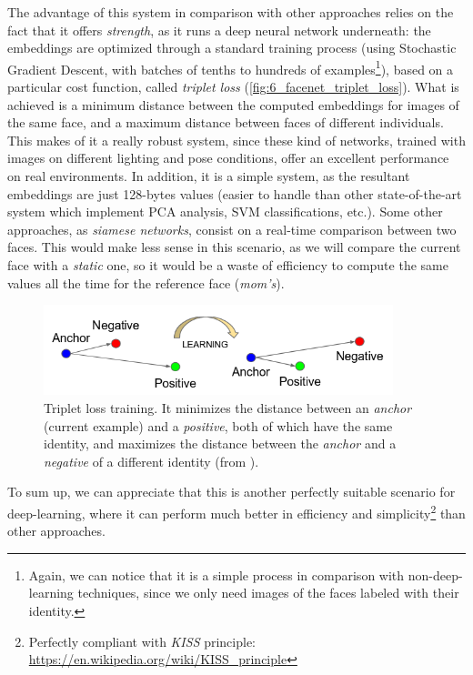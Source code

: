 		The advantage of this system in comparison with other approaches relies on the fact that it offers \emph{strength}, as it runs a deep neural network underneath: the embeddings are optimized through a standard training process (using Stochastic Gradient Descent, with batches of tenths to hundreds of examples\footnote{Again, we can notice that it is a simple process in comparison with non-deep-learning techniques, since we only need images of the faces labeled with their identity.}), based on a particular cost function, called \emph{triplet loss} (\autoref{fig:6_facenet_triplet_loss}). What is achieved is a minimum distance between the computed embeddings for images of the same face, and a maximum distance between faces of different individuals. This makes of it a really robust system, since these kind of networks, trained with images on different lighting and pose conditions, offer an excellent performance on real environments. In addition, it is a simple system, as the resultant embeddings are just 128-bytes values (easier to handle than other state-of-the-art system which implement PCA analysis, SVM classifications, etc.). Some other approaches, as \emph{siamese networks}, consist on a real-time comparison between two faces. This would make less sense in this scenario, as we will compare the current face with a \emph{static} one, so it would be a waste of efficiency to compute the same values all the time for the reference face (\emph{mom's}).\\

		
		\begin{figure}[h]
			\centering
			\includegraphics[width=4in]{images/facenet_triplet_loss}
			\caption{Triplet loss training. It minimizes the distance between an \emph{anchor} (current example) and a \emph{positive}, both of which have the same identity, and maximizes the distance between the \emph{anchor} and a \emph{negative} of a different identity (from \cite{facenet}).}
			\label{fig:6_facenet_triplet_loss}
		\end{figure}
		To sum up, we can appreciate that this is another perfectly suitable scenario for deep-learning, where it can perform much better in efficiency and simplicity\footnote{Perfectly compliant with \emph{KISS} principle: \url{https://en.wikipedia.org/wiki/KISS\_principle}} than other approaches.\\
		
